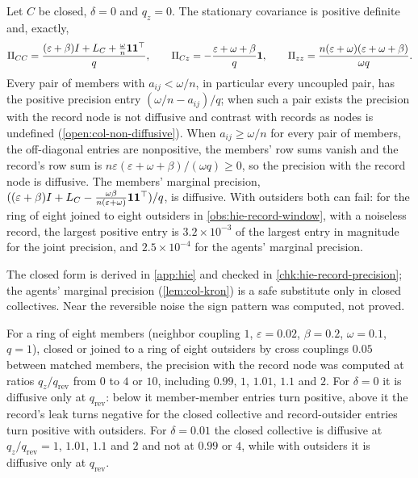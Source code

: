 \begin{example}\label{ex:hie-noiseless-record}
Let $C$ be closed, $\delta=0$ and $q_z=0$. The stationary covariance is positive definite and, exactly,
\begin{equation}\label{eq:hie-noiseless}
\Pi_{CC}=\frac{(\varepsilon+\beta)I+L_C+\frac\omega n\mathbf{1}\mathbf{1}^\top}q,\qquad\Pi_{Cz}=-\frac{\varepsilon+\omega+\beta}q\mathbf{1},\qquad\Pi_{zz}=\frac{n(\varepsilon+\omega)(\varepsilon+\omega+\beta)}{\omega q}.
\end{equation}
Every pair of members with $a_{ij}<\omega/n$, in particular every uncoupled pair, has the positive precision entry $(\omega/n-a_{ij})/q$; when such a pair exists the precision with the record node is not diffusive and contrast with records as nodes is undefined (\cref{open:col-non-diffusive}). When $a_{ij}\ge\omega/n$ for every pair of members, the off-diagonal entries are nonpositive, the members' row sums vanish and the record's row sum is $n\varepsilon(\varepsilon+\omega+\beta)/(\omega q)\ge0$, so the precision with the record node is diffusive. The members' marginal precision, $((\varepsilon+\beta)I+L_C-\frac{\omega\beta}{n(\varepsilon+\omega)}\mathbf{1}\mathbf{1}^\top)/q$, is diffusive. With outsiders both can fail: for the ring of eight joined to eight outsiders in \cref{obs:hie-record-window}, with a noiseless record, the largest positive entry is $3.2\times10^{-3}$ of the largest entry in magnitude for the joint precision, and $2.5\times10^{-4}$ for the agents' marginal precision.
\end{example}

The closed form is derived in \cref{app:hie} and checked in \cref{chk:hie-record-precision}; the agents' marginal precision (\cref{lem:col-kron}) is a safe substitute only in closed collectives. Near the reversible noise the sign pattern was computed, not proved.

\begin{observation}\label{obs:hie-record-window}
For a ring of eight members (neighbor coupling $1$, $\varepsilon=0.02$, $\beta=0.2$, $\omega=0.1$, $q=1$), closed or joined to a ring of eight outsiders by cross couplings $0.05$ between matched members, the precision with the record node was computed at ratios $q_z/q_{\mathrm{rev}}$ from $0$ to $4$ or $10$, including $0.99$, $1$, $1.01$, $1.1$ and $2$. For $\delta=0$ it is diffusive only at $q_{\mathrm{rev}}$: below it member-member entries turn positive, above it the record's leak turns negative for the closed collective and record-outsider entries turn positive with outsiders. For $\delta=0.01$ the closed collective is diffusive at $q_z/q_{\mathrm{rev}}=1$, $1.01$, $1.1$ and $2$ and not at $0.99$ or $4$, while with outsiders it is diffusive only at $q_{\mathrm{rev}}$.
\end{observation}

